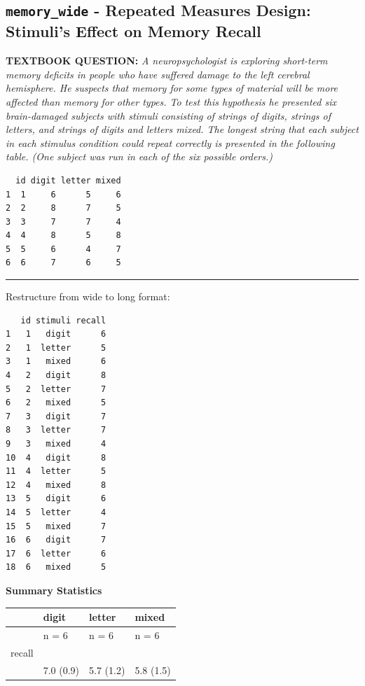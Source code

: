 \documentclass[]{article}
\begin{document}
\clearpage

\subsection{\texorpdfstring{\texttt{memory\_wide} - Repeated Measures
Design: Stimuli's Effect on Memory
Recall}{memory\_wide - Repeated Measures Design: Stimuli's Effect on Memory Recall}}\label{memory_wide---repeated-measures-design-stimulis-effect-on-memory-recall}

\textbf{TEXTBOOK QUESTION:} \emph{A neuropsychologist is exploring
short-term memory deficits in people who have suffered damage to the
left cerebral hemisphere. He suspects that memory for some types of
material will be more affected than memory for other types. To test this
hypothesis he presented six brain-damaged subjects with stimuli
consisting of strings of digits, strings of letters, and strings of
digits and letters mixed. The longest string that each subject in each
stimulus condition could repeat correctly is presented in the following
table. (One subject was run in each of the six possible orders.)}

\begin{verbatim}
  id digit letter mixed
1  1     6      5     6
2  2     8      7     5
3  3     7      7     4
4  4     8      5     8
5  5     6      4     7
6  6     7      6     5
\end{verbatim}

\begin{center}\rule{0.5\linewidth}{\linethickness}\end{center}

Restructure from wide to long format:

\begin{verbatim}
   id stimuli recall
1   1   digit      6
2   1  letter      5
3   1   mixed      6
4   2   digit      8
5   2  letter      7
6   2   mixed      5
7   3   digit      7
8   3  letter      7
9   3   mixed      4
10  4   digit      8
11  4  letter      5
12  4   mixed      8
13  5   digit      6
14  5  letter      4
15  5   mixed      7
16  6   digit      7
17  6  letter      6
18  6   mixed      5
\end{verbatim}

\clearpage

\textbf{Summary Statistics}

\begin{longtable}[]{@{}llll@{}}
\toprule
& digit & letter & mixed\tabularnewline
\midrule
\endhead
& n = 6 & n = 6 & n = 6\tabularnewline
recall & & &\tabularnewline
& 7.0 (0.9) & 5.7 (1.2) & 5.8 (1.5)\tabularnewline
\bottomrule
\end{longtable}
\end{document}
